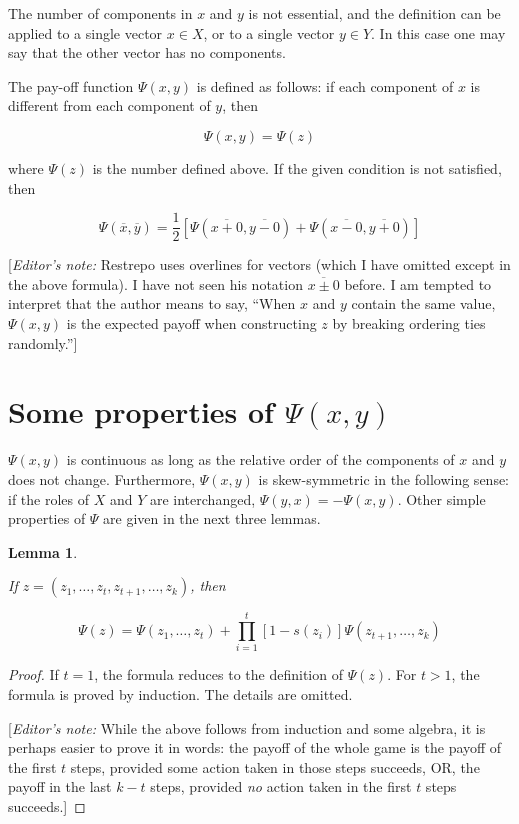 \documentclass{article}
\newtheorem{lemma}{Lemma}
\begin{document}
The number of components in $x$ and $y$ is not essential, and the definition
can be applied to a single vector $x \in X$, or to a single vector $y \in Y$.
In this case one may say that the other vector has no components.

The pay-off function $\Psi(x, y)$ is defined as follows: if each component
of $x$ is different from each component of $y$, then

\[
    \Psi(x, y) = \Psi(z)
\]

where $\Psi(z)$ is the number defined above. If the given condition is not
satisfied, then

\[
    \Psi(\overline{x}, \overline{y}) = \frac{1}{2}
    [\Psi(\overline{x + 0}, \overline{y - 0}) +
    \Psi(\overline{x - 0}, \overline{y + 0})
    ]
\]

[\emph{Editor's note:} Restrepo uses overlines for vectors (which I have omitted
except in the above formula). I have not seen his notation $\overline{x \pm 0}$
before. I am tempted to interpret that the author means to say, ``When $x$ and
$y$ contain the same value, $\Psi(x,y)$ is the expected payoff when
constructing $z$ by breaking ordering ties randomly.'']

\section{Some properties of $\Psi(x, y)$}

$\Psi(x, y)$ is continuous as long as the relative order of the components of
$x$ and $y$ does not change. Furthermore, $\Psi(x, y)$ is skew-symmetric in the
following sense: if the roles of $X$ and $Y$ are interchanged, $\Psi(y, x) =
-\Psi(x, y)$. Other simple properties of $\Psi$ are given in the next three
lemmas.

\begin{lemma} \label{lemma:psi-recursive}

If $z = (z_1, \dots, z_t, z_{t+1}, \dots, z_k)$, then

\[
\Psi(z) = \Psi(z_1, \dots, z_t) +
\prod_{i=1}^t [1-s(z_i)] \Psi(z_{t+1}, \dots, z_k)
\]

\end{lemma}

\begin{proof}

If $t = 1$, the formula reduces to the definition of $\Psi(z)$. For $t > 1$,
the formula is proved by induction. The details are omitted.

[\emph{Editor's note:} While the above follows from induction and some algebra,
it is perhaps easier to prove it in words: the payoff of the whole game is the
payoff of the first $t$ steps, provided some action taken in those steps
succeeds, OR, the payoff in the last $k - t$ steps, provided \emph{no} action
taken in the first $t$ steps succeeds.]

\end{proof}
\end{document}
